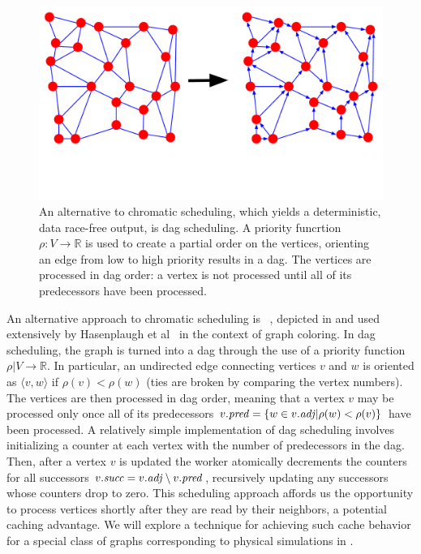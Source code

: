 \begin{figure}[!h]
\centering
\includegraphics[width=5in,clip,trim=0 3cm 0 0]{dag_scheduling.pdf}
\caption{An alternative to chromatic scheduling, which 
yields a deterministic, data race-free output, is dag scheduling.
A priority funcrtion $\rho : V \rightarrow \mathbb{R}$ is used
to create a partial order on the vertices, orienting an edge from
low to high priority results in a 
dag.  The vertices are processed in dag order: a vertex is not
processed until all of its predecessors have been processed.}
\label{fig:dag_scheduling}
\end{figure}

An alternative approach to chromatic scheduling is 
~\cite{JonesPl93},
depicted in  and used extensively by 
Hasenplaugh et al~\cite{HasenplaughKaLe14} in the context of graph
coloring.  In dag scheduling, the graph
is turned into a dag through the use of a priority function 
$\rho | V \rightarrow \mathbb{R}$.  In particular, an undirected
edge connecting vertices $v$ and $w$ is oriented as $\langle v, w \rangle$
if $\rho(v) < \rho(w)$ (ties are broken by comparing the vertex numbers).  
The vertices are then processed in dag order, meaning that a vertex
$v$ may be processed only once all of its predecessors 
$\attrib{v}{\id{pred}} = \set{w \in \attrib{v}{\id{adj}} | \rho(w) < \rho(v)}$
have been processed.  A relatively simple implementation of dag
scheduling involves initializing a counter at each vertex with the 
number of predecessors in the dag.  Then, after a vertex $v$ is updated
the worker atomically decrements the counters for all successors 
$\attrib{v}{\id{succ}} = \attrib{v}{\id{adj}} \setminus \attrib{v}{\id{pred}}$,
recursively updating any successors whose counters drop to zero.
This scheduling approach affords us the opportunity
to process vertices shortly after they are read by their neighbors,
a potential caching advantage.  We will explore a technique 
for achieving such cache behavior for a special class of graphs 
corresponding to physical simulations in .



